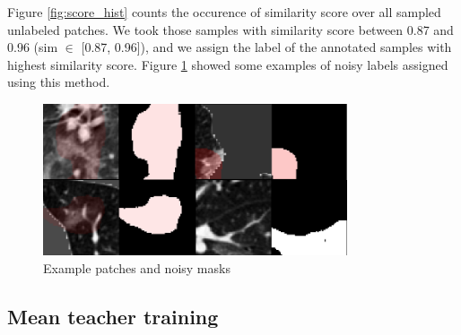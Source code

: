 Figure \ref{fig:score_hist} counts the occurence of similarity score over all sampled unlabeled patches. We took those samples with similarity score between 0.87 and 0.96 (sim $\in$ [0.87, 0.96]), and we assign the label of the annotated samples with highest similarity score. Figure \ref{fig:patches_noisy_mask} showed some examples of noisy labels assigned using this method.	

\begin{figure}[h]
	\centering
	\includegraphics[width=0.8\textwidth]{img/semi-experiment/fake_assign_example}
	\caption{Example patches and noisy masks}
	\label{fig:patches_noisy_mask}
\end{figure}
\subsection{Mean teacher training}



